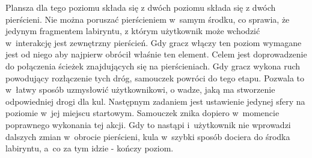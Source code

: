 \documentclass[a4paper,12pt,numbers=noenddot]{report}
\begin{document}
Plansza dla tego poziomu składa się z dwóch poziomu składa się z dwóch pierścieni. Nie można poruszać pierścieniem w~samym środku, co sprawia, że jedynym fragmentem labiryntu, z którym użytkownik może wchodzić w~interakcję jest zewnętrzny pierścień.
Gdy gracz włączy ten poziom wymagane jest od niego aby najpierw obrócił właśnie ten element. Celem jest doprowadzenie do połączenia ścieżek znajdujących się na pierścieniach. Gdy gracz wykona ruch powodujący rozłączenie tych dróg, samouczek powróci do tego etapu. Pozwala to w~łatwy sposób uzmysłowić użytkownikowi, o wadze, jaką ma stworzenie odpowiedniej drogi dla kul. 
Następnym zadaniem jest ustawienie jedynej sfery na poziomie w~jej miejscu startowym. Samouczek znika dopiero w~momencie poprawnego wykonania tej akcji. Gdy to nastąpi i~użytkownik nie wprowadzi dalszych zmian w~obrocie pierścieni, kula w~szybki sposób dociera do środka labiryntu, a~co za tym idzie - kończy poziom.
\end{document}
